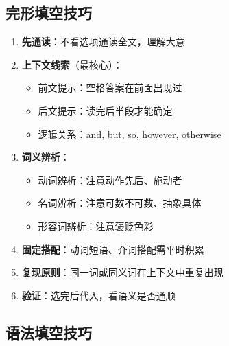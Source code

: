 \subsection{完形填空技巧}

\begin{enumerate}
  \item \textbf{先通读}：不看选项通读全文，理解大意
  \item \textbf{上下文线索}（最核心）：
    \begin{itemize}
      \item 前文提示：空格答案在前面出现过
      \item 后文提示：读完后半段才能确定
      \item 逻辑关系：and, but, so, however, otherwise
    \end{itemize}
  \item \textbf{词义辨析}：
    \begin{itemize}
      \item 动词辨析：注意动作先后、施动者
      \item 名词辨析：注意可数不可数、抽象具体
      \item 形容词辨析：注意褒贬色彩
    \end{itemize}
  \item \textbf{固定搭配}：动词短语、介词搭配需平时积累
  \item \textbf{复现原则}：同一词或同义词在上下文中重复出现
  \item \textbf{验证}：选完后代入，看语义是否通顺
\end{enumerate}

\subsection{语法填空技巧}

